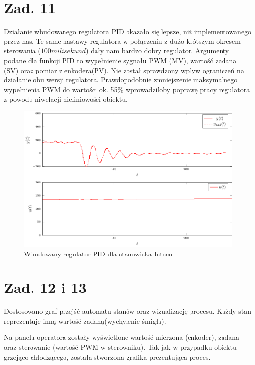 \documentclass[a4paper,titlepage,11pt,twosides,floatssmall]{mwrep}
\begin{document}
\chapter{Zad. 11}

Działanie wbudowanego regulatora PID okazało się lepsze, niż implementowanego przez nas. Te same nastawy regulatora w połączeniu z dużo krótszym okresem sterowania ($100 milisekund$) dały nam bardzo dobry regulator. Argumenty podane dla funkcji PID to wypełnienie sygnału PWM (MV), wartość zadana (SV) oraz pomiar z enkodera(PV). Nie został sprawdzony wpływ ograniczeń na działanie obu wersji regulatora. Prawdopodobnie zmniejszenie maksymalnego wypełnienia PWM do wartości ok. 55\% wprowadziłoby poprawę pracy regulatora z powodu niwelacji nieliniowości obiektu.

\begin{figure}[]
	\centering
	\includegraphics[scale=1]{../wykresy/zad11_pid.pdf}
	\caption{Wbudowany regulator PID dla stanowiska Inteco}
	\label{zad11_pid}
\end{figure}



\chapter{Zad. 12 i 13}

Dostosowano graf przejść automatu stanów oraz wizualizację procesu. Każdy stan reprezentuje inną wartość zadaną(wychylenie śmigła).

Na panelu operatora zostały wyświetlone wartość mierzona (enkoder), zadana oraz sterowanie (wartość PWM w sterowniku). Tak jak w przypadku obiektu grzejąco-chłodzącego, została stworzona grafika prezentująca proces.
\end{document}
